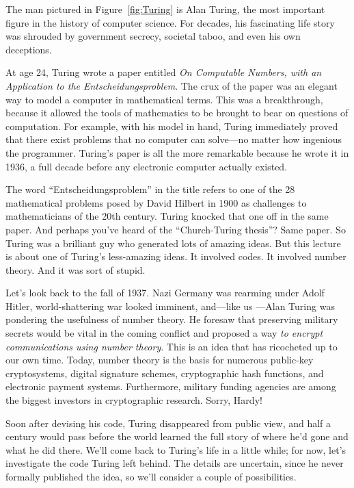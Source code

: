 The man pictured in Figure~\ref{fig:Turing} is Alan Turing, the most
important figure in the history of computer science.  For decades, his
fascinating life story was shrouded by government secrecy, societal
taboo, and even his own deceptions.

At age 24, Turing wrote a paper entitled \emph{On Computable Numbers,
  with an Application to the Entscheidungsproblem}.  The crux of the
paper was an elegant way to model a computer in mathematical terms.
This was a breakthrough, because it allowed the tools of mathematics
to be brought to bear on questions of computation.  For example, with
his model in hand, Turing immediately proved that there exist problems
that no computer can solve---no matter how ingenious the programmer.
Turing's paper is all the more remarkable because he wrote it in 1936,
a full decade before any electronic computer actually existed.

The word ``Entscheidungsproblem'' in the title refers to one of the 28
mathematical problems posed by David Hilbert in 1900 as challenges to
mathematicians of the 20th century.  Turing knocked that one off in
the same paper.  And perhaps you've heard of the ``Church-Turing
thesis''?  Same paper.  So Turing was a brilliant guy who generated
lots of amazing ideas.  But this lecture is about one of Turing's
less-amazing ideas.  It involved codes.  It involved number theory.
And it was sort of stupid.


Let's look back to the fall of 1937.  Nazi Germany was rearming under
Adolf Hitler, world-shattering war looked imminent, and---like us
---Alan Turing was pondering the usefulness of number theory.  He
foresaw that preserving military secrets would be vital in the coming
conflict and proposed a way \emph{to encrypt communications using
  number theory}.  This is an idea that has ricocheted up to our own
time.  Today, number theory is the basis for numerous public-key
cryptosystems, digital signature schemes, cryptographic hash
functions, and electronic payment systems.  Furthermore, military
funding agencies are among the biggest investors in cryptographic
research.  Sorry, Hardy!

Soon after devising his code, Turing disappeared from public
view, and half a century would pass before the world learned the full
story of where he'd gone and what he did there.  We'll come back to
Turing's life in a little while; for now, let's investigate the code
Turing left behind.  The details are uncertain, since he never
formally published the idea, so we'll consider a couple of
possibilities.

